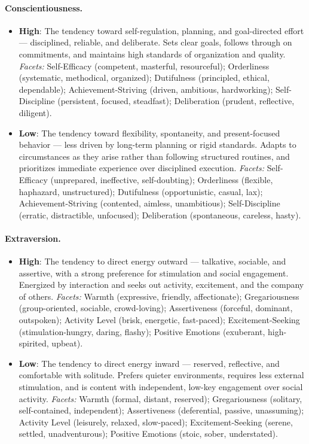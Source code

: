 \paragraph{Conscientiousness.}
\begin{itemize}
  \item \textbf{High}: The tendency toward self-regulation, planning, and goal-directed effort --- disciplined, reliable, and deliberate. Sets clear goals, follows through on commitments, and maintains high standards of organization and quality.
    \emph{Facets:} Self-Efficacy (competent, masterful, resourceful); Orderliness (systematic, methodical, organized); Dutifulness (principled, ethical, dependable); Achievement-Striving (driven, ambitious, hardworking); Self-Discipline (persistent, focused, steadfast); Deliberation (prudent, reflective, diligent).
  \item \textbf{Low}: The tendency toward flexibility, spontaneity, and present-focused behavior --- less driven by long-term planning or rigid standards. Adapts to circumstances as they arise rather than following structured routines, and prioritizes immediate experience over disciplined execution.
    \emph{Facets:} Self-Efficacy (unprepared, ineffective, self-doubting); Orderliness (flexible, haphazard, unstructured); Dutifulness (opportunistic, casual, lax); Achievement-Striving (contented, aimless, unambitious); Self-Discipline (erratic, distractible, unfocused); Deliberation (spontaneous, careless, hasty).
\end{itemize}

\paragraph{Extraversion.}
\begin{itemize}
  \item \textbf{High}: The tendency to direct energy outward --- talkative, sociable, and assertive, with a strong preference for stimulation and social engagement. Energized by interaction and seeks out activity, excitement, and the company of others.
    \emph{Facets:} Warmth (expressive, friendly, affectionate); Gregariousness (group-oriented, sociable, crowd-loving); Assertiveness (forceful, dominant, outspoken); Activity Level (brisk, energetic, fast-paced); Excitement-Seeking (stimulation-hungry, daring, flashy); Positive Emotions (exuberant, high-spirited, upbeat).
  \item \textbf{Low}: The tendency to direct energy inward --- reserved, reflective, and comfortable with solitude. Prefers quieter environments, requires less external stimulation, and is content with independent, low-key engagement over social activity.
    \emph{Facets:} Warmth (formal, distant, reserved); Gregariousness (solitary, self-contained, independent); Assertiveness (deferential, passive, unassuming); Activity Level (leisurely, relaxed, slow-paced); Excitement-Seeking (serene, settled, unadventurous); Positive Emotions (stoic, sober, understated).
\end{itemize}

